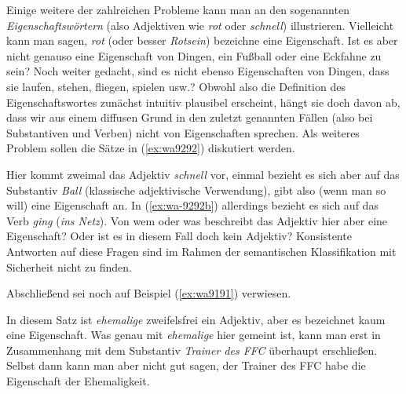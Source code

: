 Einige weitere der zahlreichen Probleme kann man an den sogenannten \textit{Eigenschaftswörtern} (also Adjektiven wie \textit{rot} oder \textit{schnell}) illustrieren.
Vielleicht kann man sagen, \textit{rot} (oder besser \textit{Rotsein}) bezeichne eine Eigenschaft.
Ist es aber nicht genauso eine Eigenschaft von Dingen, ein Fußball oder eine Eckfahne zu sein?
Noch weiter gedacht, sind es nicht ebenso Eigenschaften von Dingen, dass sie laufen, stehen, fliegen, spielen usw.?
Obwohl also die Definition des Eigenschaftswortes zunächst intuitiv plausibel erscheint, hängt sie doch davon ab, dass wir aus einem diffusen Grund in den zuletzt genannten Fällen (also bei Substantiven und Verben) nicht von Eigenschaften sprechen.
Als weiteres Problem sollen die Sätze in (\ref{ex:wa9292}) diskutiert werden.

\begin{exe}
  \ex \label{ex:wa9292}
  \begin{xlist}
  \end{xlist}
\end{exe}


Hier kommt zweimal das Adjektiv \textit{schnell} vor, einmal bezieht es sich aber auf das Substantiv \textit{Ball} (klassische adjektivische Verwendung), gibt also (wenn man so will) eine Eigenschaft an.
In (\ref{ex:wa-9292b}) allerdings bezieht es sich auf das Verb \textit{ging} (\textit{ins Netz}).
Von wem oder was beschreibt das Adjektiv hier aber eine Eigenschaft?
Oder ist es in diesem Fall doch kein Adjektiv?
Konsistente Antworten auf diese Fragen sind im Rahmen der semantischen Klassifikation mit Sicherheit nicht zu finden.

Abschließend sei noch auf Beispiel (\ref{ex:wa9191}) verwiesen.

\begin{exe}
\end{exe}

In diesem Satz ist \textit{ehemalige} zweifelsfrei ein Adjektiv, aber es bezeichnet kaum eine Eigenschaft.
Was genau mit \textit{ehemalige} hier gemeint ist, kann man erst in Zusammenhang mit dem Substantiv \textit{Trainer des FFC} überhaupt erschließen.
Selbst dann kann man aber nicht gut sagen, der Trainer des FFC habe die Eigenschaft der Ehemaligkeit.

